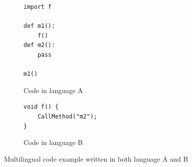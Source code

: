 \begin{figure}[t]
  \centering
  \vspace{2mm}
  \begin{subfigure}[t]{0.5\textwidth}
    \begin{lstlisting}[style=mpython]
import f

def m1():
    f()
def m2():
    pass

m1()
    \end{lstlisting}
    \vspace*{-.5em}
    \caption{Code in language A}
    \label{fig:exam:langA}
  \end{subfigure}
  \begin{subfigure}[t]{0.5\textwidth}
    \begin{lstlisting}[style=mcpp,firstnumber=9]
void f() {
    CallMethod("m2");
}
    \end{lstlisting}
    \vspace*{-.5em}
    \caption{Code in language B}
    \label{fig:exam:langB}
  \end{subfigure}
  \vspace*{-.5em}
  \caption{Multilingual code example written in both language A and B}
  \label{fig:exam}
\end{figure}

%

